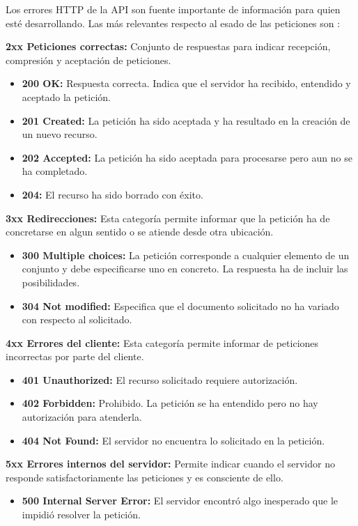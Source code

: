 Los errores HTTP de la API son fuente importante de información para quien esté desarrollando. Las más relevantes respecto al esado de las peticiones son \citep{aporta2019}:

\begin{description}
\item \textbf{2xx Peticiones correctas:} Conjunto de respuestas para indicar recepción, compresión y aceptación de peticiones.
\begin{itemize}
\item \textbf{200 OK:} Respuesta correcta. Indica que el servidor ha recibido, entendido y aceptado la petición.
\item \textbf{201 Created:} La petición ha sido aceptada y ha resultado en la creación de un nuevo recurso.
\item \textbf{202 Accepted:} La petición ha sido aceptada para procesarse pero aun no se ha completado.
\item \textbf{204:} El recurso ha sido borrado con éxito.
\end{itemize}
\item \textbf{3xx Redirecciones:} Esta categoría permite informar que la petición ha de concretarse en algun sentido o se atiende desde otra ubicación.
\begin{itemize}
\item \textbf{300 Multiple choices:} La petición corresponde a cualquier elemento de un conjunto y debe especificarse uno en concreto. La respuesta ha de incluir las posibilidades.
\item \textbf{304 Not modified:} Especifica que el documento solicitado no ha variado con respecto al solicitado.
\end{itemize}
\item \textbf{4xx Errores del cliente:} Esta categoría permite informar de peticiones incorrectas por parte del cliente.
\begin{itemize}
\item \textbf{401 Unauthorized:} El recurso solicitado requiere autorización.
\item \textbf{402 Forbidden:} Prohibido. La petición se ha entendido pero no hay autorización para atenderla.
\item \textbf{404 Not Found:} El servidor no encuentra lo solicitado en la petición.
\end{itemize}
\item \textbf{5xx Errores internos del servidor:} Permite indicar cuando el servidor no responde satisfactoriamente las peticiones y es consciente de ello.
\begin{itemize}
\item \textbf{500 Internal Server Error:} El servidor encontró algo inesperado que le impidió resolver la petición.
\end{itemize}
\end{description}



